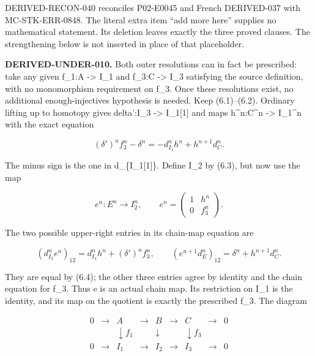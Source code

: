 \documentclass[11pt]{article}
\begin{document}
DERIVED-RECON-040 reconciles P02-E0045 and French DERIVED-037 with MC-STK-ERR-0848. The literal extra item ``add more here'' supplies no mathematical statement. Its deletion leaves exactly the three proved clauses. The strengthening below is not inserted in place of that placeholder.

\textbf{DERIVED-UNDER-010.} Both outer resolutions can in fact be prescribed:\allowbreak{} take any given f\_\allowbreak{}1:\allowbreak{}A \allowbreak{}-> I\_\allowbreak{}1 and f\_\allowbreak{}3:\allowbreak{}C \allowbreak{}-> I\_\allowbreak{}3 satisfying the source definition,\allowbreak{} with no monomorphism requirement on f\_\allowbreak{}3. Once these resolutions exist,\allowbreak{} no additional enough-injectives hypothesis is needed. Keep (6.1)\allowbreak{}–\allowbreak{}(6.2)\allowbreak{}. Ordinary lifting up to homotopy gives delta':\allowbreak{}I\_\allowbreak{}3 \allowbreak{}-> I\_\allowbreak{}1[1]\allowbreak{} and maps h\textasciicircum{}n:\allowbreak{}C\textasciicircum{}n \allowbreak{}-> I\_\allowbreak{}1\textasciicircum{}n with the exact equation

\[
 (\delta')^n f_3^n-\delta^n
       =-d_{I_1}^n h^n+h^{n+1}d_C^n.                    \tag{6.4}
\]

The minus sign is the one in d\_\allowbreak{}\{I\_\allowbreak{}1[1]\allowbreak{}\}. Define I\_\allowbreak{}2 by (6.3)\allowbreak{},\allowbreak{} but now use the map

\[
 e^n:E^n\longrightarrow I_2^n,\qquad
 e^n=\begin{pmatrix}1&h^n\\0&f_3^n\end{pmatrix}.          \tag{6.5}
\]

The two possible upper-right entries in its chain-map equation are

\[
 (d_{I_2}^n e^n)_{12}=d_{I_1}^n h^n+(\delta')^n f_3^n,\qquad
 (e^{n+1}d_E^n)_{12}=\delta^n+h^{n+1}d_C^n.
\]

They are equal by (6.4)\allowbreak{}; the other three entries agree by identity and the chain equation for f\_\allowbreak{}3. Thus e is an actual chain map. Its restriction on I\_\allowbreak{}1 is the identity,\allowbreak{} and its map on the quotient is exactly the prescribed f\_\allowbreak{}3. The diagram

\[
\begin{array}{ccccccccc}
0&\longrightarrow&A&\longrightarrow&B&\longrightarrow&C&\longrightarrow&0\\
&&\downarrow f_1&&\downarrow&&\downarrow f_3&&\\
0&\longrightarrow&I_1&\longrightarrow&I_2&\longrightarrow&I_3&\longrightarrow&0
\end{array}                                                    \tag{6.6}
\]
\end{document}
